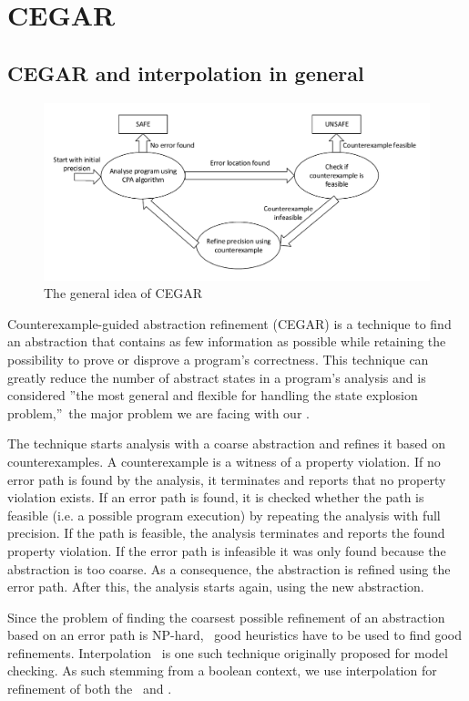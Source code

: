 \section{CEGAR}
\subsection{CEGAR and interpolation in general}
\begin{figure}[t]
\includegraphics[width=\linewidth]{theoreticalBackground/CegarPrinciple}
\caption{The general idea of CEGAR}
\label{fig:cegarPrinciple}
\end{figure}
Counterexample-guided abstraction refinement (CEGAR) \cite{Clarke2003} is a technique to find an abstraction that contains as few information as possible while retaining the possibility to prove or disprove a program's correctness.
This technique can greatly reduce the number of abstract states in a program's analysis and is considered ''the most general and flexible for handling the state explosion problem,''\cite{Clarke2003}\ the major problem we are facing with our \symbolicExecutionCPA.

The technique starts analysis with a coarse abstraction and refines it based on counterexamples. A counterexample is a witness of a property violation.\cite{Beyer2013}
If no error path is found by the analysis, it terminates and reports that no property violation exists.
If an error path is found, it is checked whether the path is feasible (i.e. a possible program execution) by repeating the analysis with full precision.
If the path is feasible, the analysis terminates and reports the found property violation.
If the error path is infeasible it was only found because the abstraction is too coarse. As a consequence, the abstraction is refined using the error path.
After this, the analysis starts again, using the new abstraction.

Since the problem of finding the coarsest possible refinement of an abstraction based on an error path is NP-hard, \cite{Clarke2003}\ good heuristics have to be used to find good refinements.
Interpolation \cite{Henzinger2004}\ is one such technique originally proposed for model checking.
As such stemming from a boolean context, we use interpolation for refinement of both the \predicateCPA\ and .

